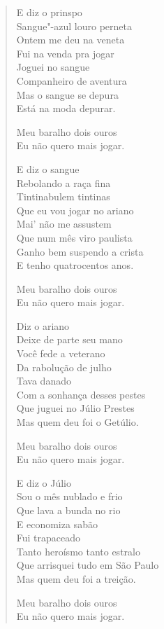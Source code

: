 {\begin{verse}
E diz o prinspo\\
Sangue"-azul louro perneta\\
Ontem me deu na veneta\\
Fui na venda pra jogar\\
Joguei no sangue\\
Companheiro de aventura\\
Mas o sangue se depura\\
Está na moda depurar.

\qquad\qquad\quad Meu baralho dois ouros\\
\qquad\qquad\quad Eu não quero mais jogar.

E diz o sangue\\
Rebolando a raça fina\\
Tintinabulem tintinas\\
Que eu vou jogar no ariano\\
Mai' não me assustem\\
Que num mês viro paulista\\
Ganho bem suspendo a crista\\
E tenho quatrocentos anos.

\qquad\qquad\quad Meu baralho dois ouros\\
\qquad\qquad\quad Eu não quero mais jogar.

Diz o ariano\\
Deixe de parte seu mano\\
Você fede a veterano\\
Da rabolução de julho\\
Tava danado\\
Com a sonhança desses pestes\\
Que juguei no Júlio Prestes\\
Mas quem deu foi o Getúlio.

\qquad\qquad\quad Meu baralho dois ouros\\
\qquad\qquad\quad Eu não quero mais jogar.

E diz o Júlio\\
Sou o mês nublado e frio\\
Que lava a bunda no rio\\
E economiza sabão\\
Fui trapaceado\\
Tanto heroísmo tanto estralo\\
Que arrisquei tudo em São Paulo\\
Mas quem deu foi a treição.

\qquad\qquad\quad Meu baralho dois ouros\\
\qquad\qquad\quad Eu não quero mais jogar.


\end{verse}}
